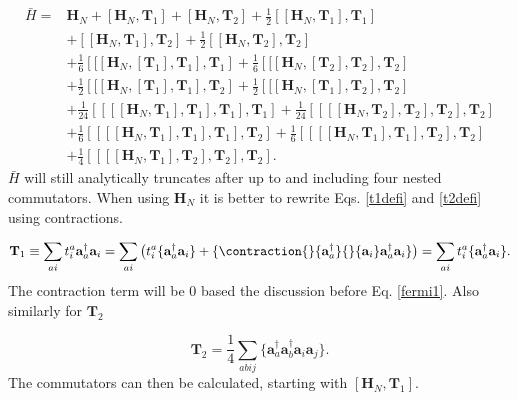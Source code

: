 \begin{align}
\bar{H} = & 
\textbf{H}_N 
+ \left[ \textbf{H}_N, \textbf{T}_1 \right] 
+ \left[ \textbf{H}_N, \textbf{T}_2 \right] 
+ \frac{1}{2} \left[ [\textbf{H}_N, \textbf{T}_1], \textbf{T}_1 \right] \label{temp_hamil_ccsd} \\ &
+ \left[ [\textbf{H}_N, \textbf{T}_1], \textbf{T}_2  \right]
+ \frac{1}{2} \left[ [\textbf{H}_N, \textbf{T}_2], \textbf{T}_2 \right] \nonumber \\ &
+ \frac{1}{6} \left[ [ [ \textbf{H}_N,[\textbf{T}_1], \textbf{T}_1], \textbf{T}_1 \right]
+ \frac{1}{6} \left[ [ [ \textbf{H}_N,[\textbf{T}_2], \textbf{T}_2], \textbf{T}_2 \right] \nonumber \\ &
+ \frac{1}{2} \left[ [ [ \textbf{H}_N,[\textbf{T}_1], \textbf{T}_1], \textbf{T}_2 \right]
+ \frac{1}{2} \left[ [ [ \textbf{H}_N,[\textbf{T}_1], \textbf{T}_2], \textbf{T}_2 \right] \nonumber \\ &
+ \frac{1}{24} \left[ [ [ [\textbf{H}_N, \textbf{T}_1], \textbf{T}_1], \textbf{T}_1], \textbf{T}_1  \right]
+ \frac{1}{24} \left[ [ [ [\textbf{H}_N, \textbf{T}_2], \textbf{T}_2], \textbf{T}_2], \textbf{T}_2  \right] \nonumber \\ &
+ \frac{1}{6} \left[ [ [ [\textbf{H}_N, \textbf{T}_1], \textbf{T}_1], \textbf{T}_1], \textbf{T}_2  \right]
+ \frac{1}{6} \left[ [ [ [\textbf{H}_N, \textbf{T}_1], \textbf{T}_1], \textbf{T}_2], \textbf{T}_2  \right] \nonumber \\ &
+ \frac{1}{4} \left[ [ [ [\textbf{H}_N, \textbf{T}_1], \textbf{T}_2], \textbf{T}_2], \textbf{T}_2  \right] . \nonumber
\end{align}
$\bar{H}$ will still analytically truncates after up to and including four nested commutators. When using $\textbf{H}_N$ it is better to rewrite Eqs. \eqref{t1defi} and \eqref{t2defi} using contractions.

\begin{equation}
\textbf{T}_1 \equiv \sum_{ai} t_i^a \textbf{a}^{\dag}_a \textbf{a}_i = \sum_{ai} \left( t_i^a \{\textbf{a}^{\dag}_a \textbf{a}_i\} + \{
\contraction{}{\textbf{a}^{\dag}_a}{}{\textbf{a}_i}
\textbf{a}^{\dag}_a \textbf{a}_i
\} \right) = \sum_{ai} t_i^a \{\textbf{a}^{\dag}_a \textbf{a}_i\} .
\end{equation}
The contraction term will be 0 based the discussion before Eq. \eqref{fermi1}. Also similarly for $\textbf{T}_2$

\begin{equation}
\textbf{T}_2 = \frac{1}{4} \sum_{abij} \{
\textbf{a}^{\dag}_a \textbf{a}^{\dag}_b
\textbf{a}_i \textbf{a}_j \} .
\end{equation}
The commutators can then be calculated, starting with $[\textbf{H}_N, \textbf{T}_1]$.

